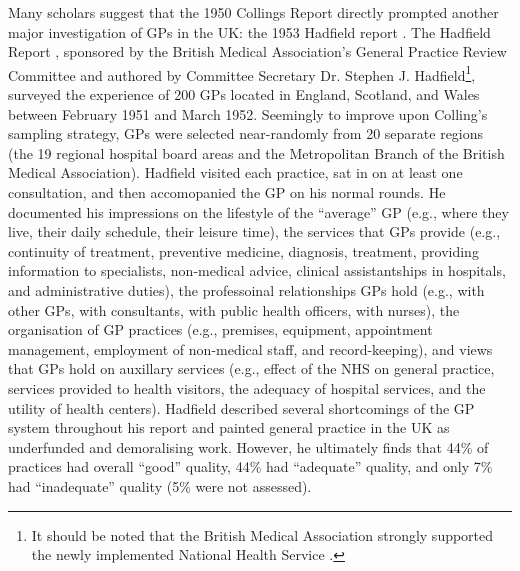 \documentclass[12pt]{article}
\begin{document}
Many scholars suggest that the 1950 Collings Report directly prompted another major investigation of GPs in the UK: the 1953 Hadfield report \citep{wilkieBritishGeneralPractice2014}. The Hadfield Report \citep{hadfieldFieldSurveyGeneral1953}, sponsored by the British Medical Association's General Practice Review Committee and authored by Committee Secretary Dr. Stephen J. Hadfield\footnote{It should be noted that the British Medical Association strongly supported the newly implemented National Health Service \citep{anonymousGeneralPracticeToday1953}.}, surveyed the experience of 200 GPs located in England, Scotland, and Wales between February 1951 and March 1952. Seemingly to improve upon Colling's sampling strategy, GPs were selected near-randomly from 20 separate regions (the 19 regional hospital board areas and the Metropolitan Branch of the British Medical Association). Hadfield visited each practice, sat in on at least one consultation, and then accomopanied the GP on his normal rounds. He documented his impressions on the lifestyle of the ``average'' GP (e.g., where they live, their daily schedule, their leisure time), the services that GPs provide (e.g., continuity of treatment, preventive medicine, diagnosis, treatment, providing information to specialists, non-medical advice, clinical assistantships in hospitals, and administrative duties), the professoinal relationships GPs hold (e.g., with other GPs, with consultants, with public health officers, with nurses), the organisation of GP practices (e.g., premises, equipment, appointment management, employment of non-medical staff, and record-keeping), and views that GPs hold on auxillary services (e.g., effect of the NHS on general practice, services provided to health visitors, the adequacy of hospital services, and the utility of health centers). Hadfield described several shortcomings of the GP system throughout his report and painted general practice in the UK as underfunded and demoralising work. However, he ultimately finds that 44\% of practices had overall ``good'' quality, 44\% had ``adequate'' quality, and only 7\% had  ``inadequate'' quality (5\% were not assessed).
\end{document}
